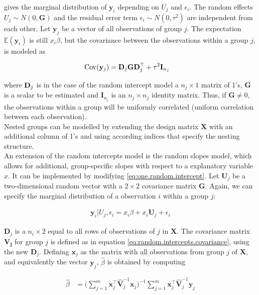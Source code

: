 \documentclass[11pt,a4paper,twoside]{book}\usepackage[]{graphicx}\usepackage[]{color}
\begin{document}
gives the marginal distribution of $\mathbf{y}_i$ depending on $U{_j}$ and $\epsilon_i$. The random effects $U_j \sim N(0, \mathbf{G})$ and the residual error term $\epsilon_i \sim N(0, \tau^{2})$ are independent from each other. Let $\mathbf{y}_j$ be a vector of all observations of group $j$. The expectation $\mathbb{E}(\mathbf{y}_i)$ is still $x_i \beta$, but the covariance between the observations within a group $j$, is modeled as

\begin{align}
\operatorname{Cov}(\mathbf{y}_j) &= \mathbf{D}_j \mathbf{G} \mathbf{D}_j^\top + \tau^2 \mathbf{I}_{n_j} \label{eq:random.intercepts.covariance}
\end{align}

where ${\mathbf{D}}_j$ is in the case of the random intercept model a $n_j \times 1$ matrix of 1's, $\mathbf{G}$ is a scalar to be estimated and $\mathbf{I}_{n_j}$ is an $n_j \times n_j$ identity matrix. Thus, if $\mathbf{G} \neq 0$, the observations within a group will be uniformly correlated (uniform correlation between each observation). \\
Nested groups can be modelled by extending the design matrix $\mathbf{X}$ with an additional column of 1's and using according indices that specify the nesting structure.\\
An extension of the random intercepts model is the random slopes model, which allows for additional, group-specific slopes with respect to a explanatory variable $x$. It can be implemented by modifying \eqref{eq:one.random.intercept}. Let $\mathbf{U}_j$ be a two-dimensional random vector with a $2 \times 2$ covariance matrix $\mathbf{G}$. Again, we can specify the marginal distribution of a observation $i$ within a group $j$:

\begin{align}
\mathbf{y}_i|U_j,\epsilon_i =  x_i\beta + x_i \mathbf{U}_j + \epsilon_i \label{eq:one.random.intercept.and.slope}
\end{align}

$\mathbf{D}_j$ is a $n_i \times 2$ equal to all rows of observations of $j$ in $\mathbf{X}$. The covariance matrix $\mathbf{V_j}$ for group $j$ is defined as in equation \eqref{eq:random.intercepts.covariance}, using the new $\mathbf{D}_j$. Defining $\mathbf{x}_j$ as the matrix with all observations from group $j$ of $\mathbf{X}$, and equivalently the vector $\mathbf{y}_j$, $\hat{\beta}$ is obtained by computing

\begin{align}
\hat{\beta} &= \Big( \sum_{j = 1}^m \mathbf{x}_j^\top \hat{\mathbf{V}}_j^{-1} \mathbf{x}_j \Big)^{-1} \sum_{j = 1}^m \mathbf{x}_j^\top \hat{\mathbf{V}}_j^{-1} \mathbf{y}_j
\end{align}
\end{document}
